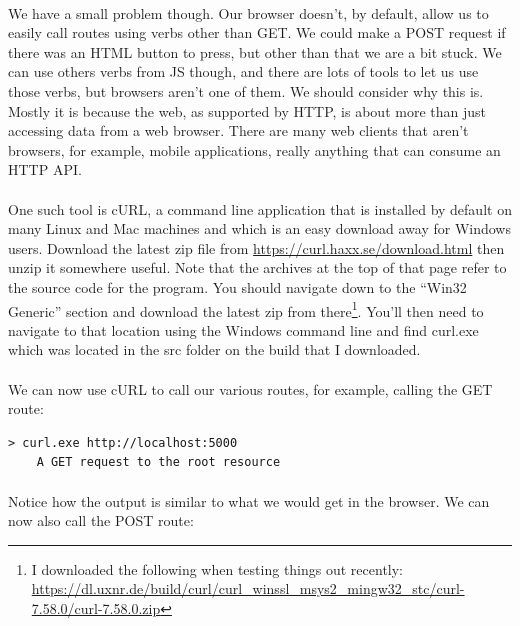 \documentclass[10pt, a4paper, twosize]{article}
\begin{document}
\paragraph{} We have a small problem though. Our browser doesn't, by default, allow us to easily call routes using verbs other than GET. We could make a POST request if there was an HTML button to press, but other than that we are a bit stuck. We can use others verbs from JS though, and there are lots of tools to let us use those verbs, but browsers aren't one of them. We should consider why this is. Mostly it is because the web, as supported by HTTP, is about more than just accessing data from a web browser. There are many web clients that aren't browsers, for example, mobile applications, really anything that can consume an HTTP API.

\paragraph{} One such tool is cURL, a command line application that is installed by default on many Linux and Mac machines and which is an easy download away for Windows users. Download the latest zip file from \url{https://curl.haxx.se/download.html} then unzip it somewhere useful. Note that the archives at the top of that page refer to the source code for the program. You should navigate down to the ``Win32 Generic'' section and download the latest zip from there\footnote{I downloaded the following when testing things out recently: \url{https://dl.uxnr.de/build/curl/curl_winssl_msys2_mingw32_stc/curl-7.58.0/curl-7.58.0.zip}}. You'll then need to navigate to that location using the Windows command line and find curl.exe which was located in the src folder on the build that I downloaded.

\paragraph{} We can now use cURL to call our various routes, for example, calling the GET route:

\begin{lstlisting}[style=DOS]
    > curl.exe http://localhost:5000
    A GET request to the root resource
\end{lstlisting}

\paragraph{} Notice how the output is similar to what we would get in the browser. We can now also call the POST route:
\end{document}

